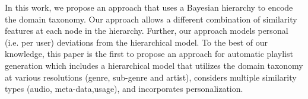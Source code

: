 In this work, we propose an approach that uses a Bayesian hierarchy to encode the domain taxonomy.
Our approach allows a different combination of similarity features at each node in the hierarchy. Further, our approach models personal (i.e. per user) deviations from the hierarchical model.
To the best of our knowledge, this paper is the first to propose an approach for automatic  playlist generation which includes a hierarchical model that utilizes the domain taxonomy at various resolutions (genre, sub-genre and artist), considers multiple similarity types (audio, meta-data,usage), and incorporates personalization.





%
%
%  	
%
